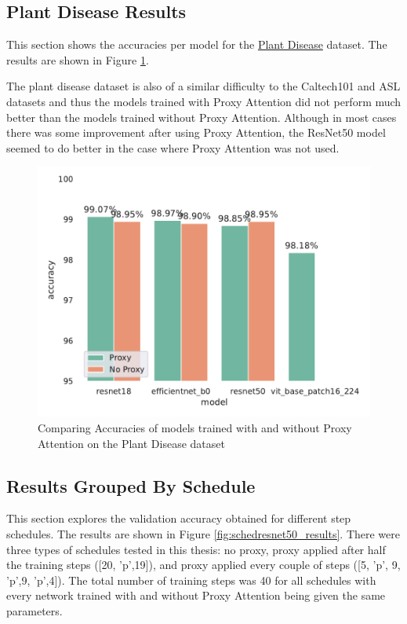 \subsection{Plant Disease Results}
This section shows the accuracies per model for the \href{https://www.kaggle.com/datasets/rajibdpi/plant-disease-dataset}{Plant Disease} dataset. The results are shown in Figure \ref{fig:plantdisease_results}. 

The plant disease dataset is also of a similar difficulty to the Caltech101 and ASL datasets and thus the models trained with Proxy Attention did not perform much better than the models trained without Proxy Attention. Although in most cases there was some improvement after using Proxy Attention, the ResNet50 model seemed to do better in the case where Proxy Attention was not used. 
\begin{figure}[!htb]
    \centering
    \includegraphics[width=.6\linewidth]{results/plantdisease_results.pdf}
    \caption{Comparing Accuracies of models trained with and without Proxy Attention on the Plant Disease dataset}
    \label{fig:plantdisease_results}
\end{figure}


\subsection{Results Grouped By Schedule}
This section explores the validation accuracy obtained for different step schedules. The results are shown in Figure \ref{fig:schedresnet50_results}. 
There were three types of schedules tested in this thesis: no proxy, proxy applied after half the training steps ([20, 'p',19]), and proxy applied every couple of steps ([5, 'p', 9, 'p',9, 'p',4]). The total number of training steps was 40 for all schedules with every network trained with and without Proxy Attention being given the same parameters. 


